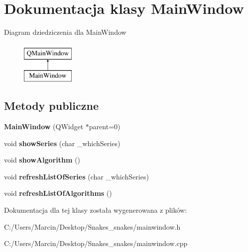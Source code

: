 \hypertarget{class_main_window}{\section{Dokumentacja klasy Main\+Window}
\label{class_main_window}
}
Diagram dziedziczenia dla Main\+Window\begin{figure}[H]
\begin{center}
\leavevmode
\includegraphics[height=2.000000cm]{class_main_window}
\end{center}
\end{figure}
\subsection*{Metody publiczne}
\begin{DoxyCompactItemize}
\item 
\hypertarget{class_main_window_a8b244be8b7b7db1b08de2a2acb9409db}{{\bfseries Main\+Window} (Q\+Widget $\ast$parent=0)}\label{class_main_window_a8b244be8b7b7db1b08de2a2acb9409db}

\item 
\hypertarget{class_main_window_a68ca3ca43e0ae2bb80b2189cbe3c952d}{void {\bfseries show\+Series} (char \+\_\+which\+Series)}\label{class_main_window_a68ca3ca43e0ae2bb80b2189cbe3c952d}

\item 
\hypertarget{class_main_window_a2082607856eb2f613c09c8bc6169cb08}{void {\bfseries show\+Algorithm} ()}\label{class_main_window_a2082607856eb2f613c09c8bc6169cb08}

\item 
\hypertarget{class_main_window_afb6884e8e101c419df2e76d842410de1}{void {\bfseries refresh\+List\+Of\+Series} (char \+\_\+which\+Series)}\label{class_main_window_afb6884e8e101c419df2e76d842410de1}

\item 
\hypertarget{class_main_window_a217ae03990f0b471237c167fb1d8d9e3}{void {\bfseries refresh\+List\+Of\+Algorithms} ()}\label{class_main_window_a217ae03990f0b471237c167fb1d8d9e3}

\end{DoxyCompactItemize}


Dokumentacja dla tej klasy została wygenerowana z plików\+:\begin{DoxyCompactItemize}
\item 
C\+:/\+Users/\+Marcin/\+Desktop/\+Snakes\+\_\+snakes/mainwindow.\+h\item 
C\+:/\+Users/\+Marcin/\+Desktop/\+Snakes\+\_\+snakes/mainwindow.\+cpp\end{DoxyCompactItemize}
